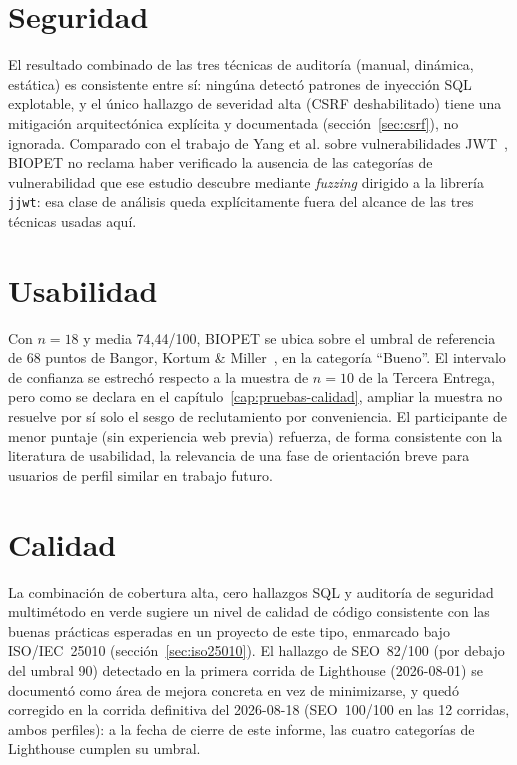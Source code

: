 \section{Seguridad}

El resultado combinado de las tres t\'ecnicas de auditor\'ia (manual,
din\'amica, est\'atica) es consistente entre s\'i: ning\'una detect\'o
patrones de inyecci\'on SQL explotable, y el \'unico hallazgo de severidad
alta (CSRF deshabilitado) tiene una mitigaci\'on arquitect\'onica expl\'icita
y documentada (secci\'on~\ref{sec:csrf}), no ignorada. Comparado con el
trabajo de Yang et al. sobre vulnerabilidades JWT~\cite{yang2026tokentimebomb},
BIOPET no reclama haber verificado la ausencia de las categor\'ias de
vulnerabilidad que ese estudio descubre mediante \emph{fuzzing} dirigido a
la librer\'ia \texttt{jjwt}: esa clase de an\'alisis queda expl\'icitamente
fuera del alcance de las tres t\'ecnicas usadas aqu\'i.

\section{Usabilidad}

Con $n=18$ y media 74{,}44/100, BIOPET se ubica sobre el umbral de
referencia de 68 puntos de Bangor, Kortum \& Miller~\cite{bangor2008sus},
en la categor\'ia ``Bueno''. El intervalo de confianza se estrech\'o
respecto a la muestra de $n=10$ de la Tercera Entrega, pero como se declara
en el cap\'itulo~\ref{cap:pruebas-calidad}, ampliar la muestra no resuelve
por s\'i solo el sesgo de reclutamiento por conveniencia. El participante
de menor puntaje (sin experiencia web previa) refuerza, de forma
consistente con la literatura de usabilidad, la relevancia de una fase de
orientaci\'on breve para usuarios de perfil similar en trabajo futuro.

\section{Calidad}

La combinaci\'on de cobertura alta, cero hallazgos SQL y auditor\'ia de
seguridad multim\'etodo en verde sugiere un nivel de calidad de c\'odigo
consistente con las buenas pr\'acticas esperadas en un proyecto de este
tipo, enmarcado bajo ISO/IEC~25010 (secci\'on~\ref{sec:iso25010}). El
hallazgo de SEO~82/100 (por debajo del umbral 90) detectado en la primera
corrida de Lighthouse (2026-08-01) se document\'o como \'area de mejora
concreta en vez de minimizarse, y qued\'o corregido en la corrida definitiva
del 2026-08-18 (SEO~100/100 en las 12 corridas, ambos perfiles): a la fecha
de cierre de este informe, las cuatro categor\'ias de Lighthouse cumplen su
umbral.

